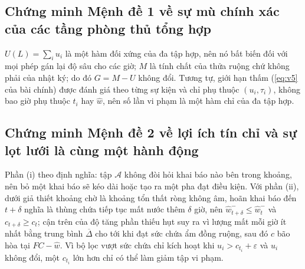 \subsection*{Chứng minh Mệnh đề 1 về sự mù chính xác của các tầng phòng thủ tổng hợp}

$U(L)=\sum_i u_i$ là một hàm đối xứng của đa tập hợp, nên nó bất biến đối với mọi phép gán
lại độ sâu cho các giờ; $M$ là tính chất của thửa ruộng chứ không phải của nhật ký; do đó
$G=M-U$ không đổi. Tương tự, giới hạn thấm (\eqref{eq:v5} của bài chính) được đánh giá
theo từng sự kiện và chỉ phụ thuộc $(u_i,\tau_i)$, không bao giờ phụ thuộc $t_i$ hay
$\hat w$, nên số lần vi phạm là một hàm chỉ của đa tập hợp.

\subsection*{Chứng minh Mệnh đề 2 về lợi ích tín chỉ và sự lọt lưới là cùng một hành động}

Phần (i) theo định nghĩa: tập $\mathcal{A}$ không đòi hỏi khai báo nào bên trong
khoảng, nên bỏ một khai báo sẽ kéo dài hoặc tạo ra một pha đạt điều kiện. Với phần
(ii), dưới giả thiết khoảng chờ là khoảng tổn thất ròng không âm, hoãn khai báo đến
$t+\delta$ nghĩa là thùng chứa tiếp tục mất nước thêm $\delta$ giờ, nên
$\hat w_{t+\delta}^{-}\le\hat w_t^{-}$ và
$c_{t+\delta}\ge c_t$; cận trên của độ tăng phần thiếu hụt suy ra vì lượng
mất mỗi giờ ít nhất bằng trung bình $\overline{\Delta}$ cho tới khi đạt sức
chứa ẩm đồng ruộng, sau đó $c$ bão hòa tại $FC-\hat w$. Vì bộ lọc vượt sức chứa
chỉ kích hoạt khi $u_i>c_{t_i}+\varepsilon$ và $u_i$ không đổi, một $c_{t_i}$ lớn
hơn chỉ có thể làm giảm tập vi phạm.

